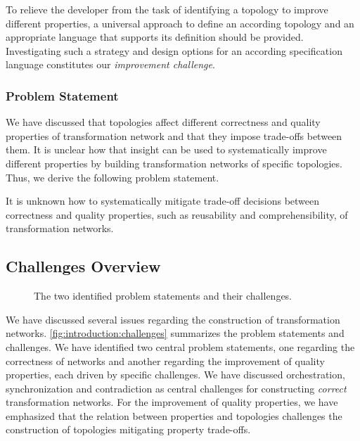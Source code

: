 To relieve the developer from the task of identifying a topology to improve different properties, a universal approach to define an according topology and an appropriate language that supports its definition should be provided.
Investigating such a strategy and design options for an according specification language constitutes our \emph{improvement challenge}.

\subsubsection*{Problem Statement}

We have discussed that topologies affect different correctness and quality properties of transformation network and that they impose trade-offs between them.
It is unclear how that insight can be used to systematically improve different properties by building transformation networks of specific topologies.
Thus, we derive the following problem statement.

\begin{problemstatement}
    It is unknown how to systematically mitigate trade-off decisions between correctness and quality properties, such as reusability and comprehensibility, of transformation networks.
\end{problemstatement}


\subsection{Challenges Overview}

\begin{figure}
    \centering
    
    \caption[Problem statements and challenges]{The two identified problem statements and their challenges.}
    \label{fig:introduction:challenges}
\end{figure}

We have discussed several issues regarding the construction of transformation networks.
\autoref{fig:introduction:challenges} summarizes the problem statements and challenges.
We have identified two central problem statements, one regarding the correctness of networks and another regarding the improvement of quality properties, each driven by specific challenges.
We have discussed orchestration, synchronization and contradiction as central challenges for constructing \emph{correct} transformation networks.
For the improvement of quality properties, we have emphasized that the relation between properties and topologies challenges the construction of topologies mitigating property trade-offs. %


